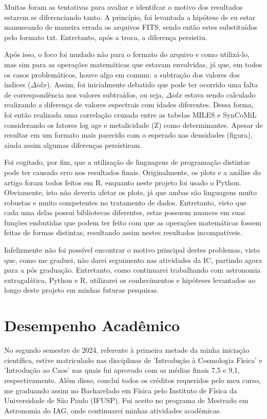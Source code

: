 \documentclass[12pt]{projeto}
\begin{document}
Muitas foram as tentativas para avaliar e identifcar o motivo dos resultados estarem se diferenciando tanto. A princípio, foi levantada a hipótese de eu estar manuseando de maneira errada os arquivos FITS, sendo então estes substituídos pelo formato txt. Entretanto, após a troca, a diferença persistiu.

Após isso, o foco foi mudado não para o formato do arquivo e como utilizá-lo, mas sim para as operações matemáticas que estavam envolvidas, já que, em todos os casos problemáticos, houve algo em comum: a subtração dos valores dos índices (\(\Delta idx\)). Assim, foi inicialmente debatido que pode ter ocorrido uma falta de correspondência nos valores subtraídos, ou seja, \(\Delta idx\) estava sendo calculado realizando a diferença de valores espectrais com idades diferentes. Dessa forma, foi então realizada uma correlação cruzada entre as tabelas MILES e SynCoMiL considerando os fatores log age e metalicidade (Z) como determinantes. Apesar de resultar em um formato mais parecido com o esperado nas densidades (figura), ainda assim algumas diferenças persistiram.

Foi cogitado, por fim, que a utilização de linguagens de programação distintas pode ter causado erro nos resultados finais. Originalmente, os plots e a análise do artigo foram todos feitos em R, enquanto neste projeto foi usado o Python. Obviamente, isto não deveria afetar os plots, já que ambas são linguagens muito robustas e muito competentes no tratamento de dados. Entretanto, visto que cada uma delas possui bibliotecas diferentes, estas possuem nuances em suas funções embutidas que podem ter feito com que as operações matemáticas fossem feitas de formas distintas, resultando assim nestes resultados incompatíveis.

Infelizmente não foi possível encontrar o motivo principal destes problemas, visto que, como me graduei, não darei seguimento nas atividades da IC, partindo agora para a pós graduação. Entretanto, como continuarei trabalhando com astronomia extragalática, Python e R, utilizarei os conhecimentos e hipóteses levantados ao longo deste projeto em minhas futuras pesquisas. 

\section{Desempenho Acadêmico}
No segundo semestre de 2024, referente à primeira metade da minha iniciação científica, estive matriculado nas disciplinas de 'Introdução à Cosmologia Física' e 'Introdução ao Caos' nas quais fui aprovado com as médias finais 7,5 e 9,1, respectivamente. Além disso, concluí todos os créditos requeridos pelo meu curso, me graduando assim no Bacharelado em Física pelo Instituto de Física da Universidade de São Paulo (IFUSP). Fui aceito no programa de Mestrado em Astronomia do IAG, onde continuarei minhas atividades acadêmicas.
\end{document}
